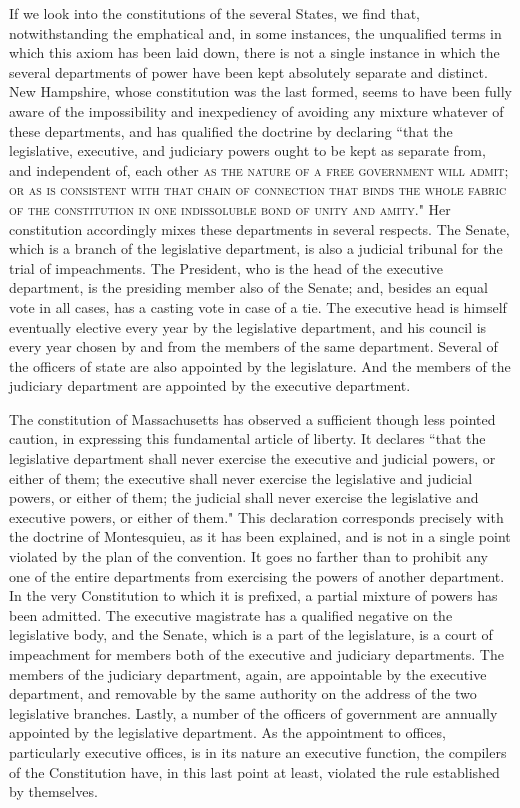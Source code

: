 If we look into the constitutions of the several States, we find that, notwithstanding the emphatical and, in some instances, the unqualified terms in which this axiom has been laid down, there is not a single instance in which the several departments of power have been kept absolutely separate and distinct. 
New Hampshire, whose constitution was the last formed, seems to have been fully aware of the impossibility and inexpediency of avoiding any mixture whatever of these departments, and has qualified the doctrine by declaring ``that the legislative, executive, and judiciary powers ought to be kept as separate from, and independent of, each other \textsc{as the nature of a free government will admit}; \textsc{or as is consistent with that chain of connection that binds the whole fabric of the constitution in one indissoluble bond of unity and amity}." Her constitution accordingly mixes these departments in several respects. 
The Senate, which is a branch of the legislative department, is also a judicial tribunal for the trial of impeachments. 
The President, who is the head of the executive department, is the presiding member also of the Senate; and, besides an equal vote in all cases, has a casting vote in case of a tie. 
The executive head is himself eventually elective every year by the legislative department, and his council is every year chosen by and from the members of the same department. 
Several of the officers of state are also appointed by the legislature. 
And the members of the judiciary department are appointed by the executive department.

The constitution of Massachusetts has observed a sufficient though less pointed caution, in expressing this fundamental article of liberty. 
It declares ``that the legislative department shall never exercise the executive and judicial powers, or either of them; the executive shall never exercise the legislative and judicial powers, or either of them; the judicial shall never exercise the legislative and executive powers, or either of them." This declaration corresponds precisely with the doctrine of Montesquieu, as it has been explained, and is not in a single point violated by the plan of the convention. 
It goes no farther than to prohibit any one of the entire departments from exercising the powers of another department. 
In the very Constitution to which it is prefixed, a partial mixture of powers has been admitted. 
The executive magistrate has a qualified negative on the legislative body, and the Senate, which is a part of the legislature, is a court of impeachment for members both of the executive and judiciary departments. 
The members of the judiciary department, again, are appointable by the executive department, and removable by the same authority on the address of the two legislative branches. 
Lastly, a number of the officers of government are annually appointed by the legislative department. 
As the appointment to offices, particularly executive offices, is in its nature an executive function, the compilers of the Constitution have, in this last point at least, violated the rule established by themselves.

